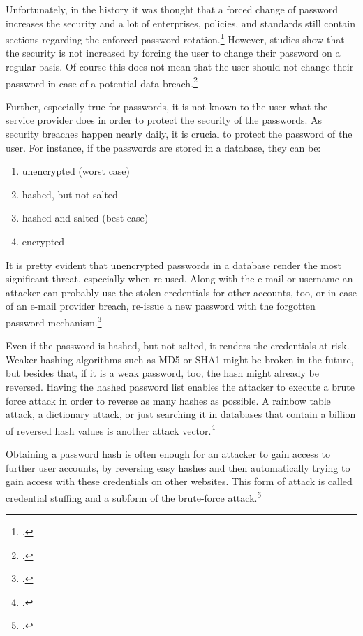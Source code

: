 Unfortunately, in the history it was thought that a forced change of password increases the security and a lot of enterprises, policies, and standards still contain sections regarding the enforced password rotation.\footcites[See][1520]{deutschlandgrundschutz} However, studies show that the security is not increased by forcing the user to change their password on a regular basis. Of course this does not mean that the user should not change their password in case of a potential data breach.\footcites[See][14]{SP80063B}[See][]{7676198}[See][34]{anderson2008security}

Further, especially true for passwords, it is not known to the user what the service provider does in order to protect the security of the passwords. As security breaches happen nearly daily, it is crucial to protect the password of the user. For instance, if the passwords are stored in a database, they can be:

\begin{enumerate}[label=(\alph*)]
	\item unencrypted (worst case)
	\item hashed, but not salted
	\item hashed and salted (best case)
	\item encrypted
\end{enumerate}

It is pretty evident that unencrypted passwords in a database render the most significant threat, especially when re-used. Along with the e-mail or username an attacker can probably use the stolen credentials for other accounts, too, or in case of an e-mail provider breach, re-issue a new password with the \frqq forgotten password\flqq{} mechanism.\footcite[See][277]{shostack2014threat}

Even if the password is hashed, but not salted, it renders the credentials at risk. Weaker hashing algorithms such as MD5 or SHA1 might be broken in the future, but besides that, if it is a weak password, too, the hash might already be reversed. Having the hashed password list enables the attacker to execute a brute force attack in order to reverse as many hashes as possible. A rainbow table attack, a dictionary attack, or just searching it in databases that contain a billion of reversed hash values is another attack vector.\footcites[See][1425]{Thomas:2017:DBP:3133956.3134067}[See][427--430]{320284}[See][56--57]{anderson2008security}

Obtaining a password hash is often enough for an attacker to gain access to further user accounts, by reversing easy hashes and then automatically trying to gain access with these credentials on other websites. This form of attack is called \frqq credential stuffing\flqq{} and a subform of the brute-force attack.\footcites[See][]{troy-hunt-1}[See][1565]{48399}

